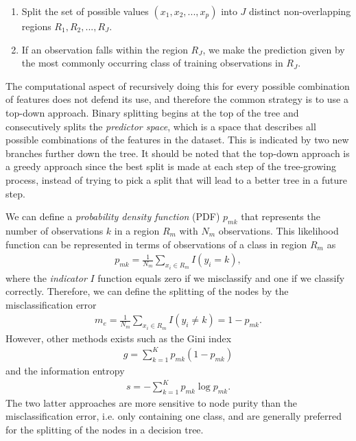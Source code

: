 \begin{enumerate}
  \item Split the set of possible values $(x_1, x_2,...,x_p)$ into $J$ distinct non-overlapping regions $R_1, R_2, ..., R_{J}$.
  \item If an observation falls within the region $R_J$, we make the prediction given by the most commonly occurring class of training observations in $R_{J}$.
\end{enumerate}
The computational aspect of recursively doing this for every possible combination of features does not defend its use, and therefore the common strategy is to use a top-down approach. Binary splitting begins at the top of the tree and consecutively splits the \textit{predictor space}, which is a space that describes all possible combinations of the features in the dataset. This is indicated by two new branches further down the tree. It should be noted that the top-down approach is a greedy approach since the best split is made at each step of the tree-growing process, instead of trying to pick a split that will lead to a better tree in a future step.

We can define a \textit{probability density function} (PDF) $p_{mk}$ that represents the number of observations $k$ in a region $R_m$ with $N_m$ observations. This likelihood function can be represented in terms of observations of a class in region $R_m$ as
\begin{align}
  p_{mk} = \frac{1}{N_m} \sum_{x_i \in R_m} I(y_i = k),
\end{align}
where the \textit{indicator} $I$ function equals zero if we misclassify and one if we classify correctly. Therefore, we can define the splitting of the nodes by the misclassification error
\begin{align}
  m_{e} = \frac{1}{N_m} \sum_{x_i \in R_m} I(y_i \neq k) = 1 - p_{mk}.
\end{align}
However, other methods exists such as the Gini index
\begin{align}
  g = \sum_{k=1}^{K} p_{mk} (1-p_{mk})
\end{align}
and the information entropy
\begin{align}
  s = - \sum_{k=1}^{K} p_{mk} \log p_{mk}.
\end{align}
The two latter approaches are more sensitive to node purity than the misclassification error, i.e. only containing one class, and are generally preferred \cite{Murphy2012} for the splitting of the nodes in a decision tree.


